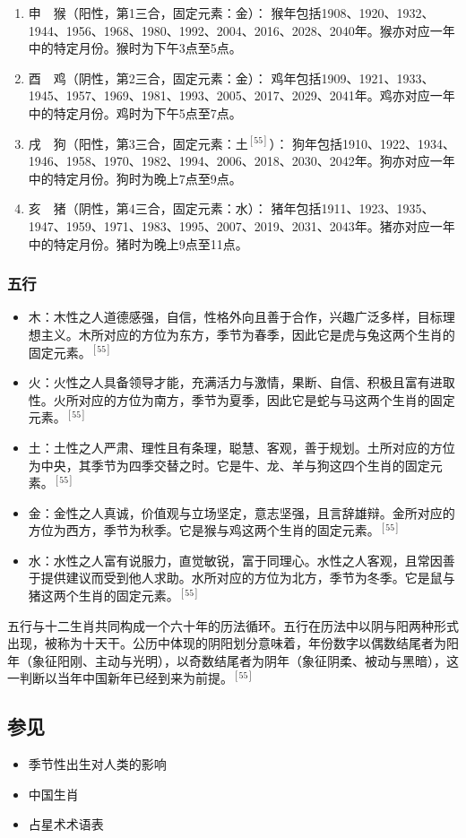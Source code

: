 \begin{enumerate}
\item 申　猴（阳性，第1三合，固定元素：金）：  
猴年包括1908、1920、1932、1944、1956、1968、1980、1992、2004、2016、2028、2040年。猴亦对应一年中的特定月份。猴时为下午3点至5点。
\item 酉　鸡（阴性，第2三合，固定元素：金）：  
鸡年包括1909、1921、1933、1945、1957、1969、1981、1993、2005、2017、2029、2041年。鸡亦对应一年中的特定月份。鸡时为下午5点至7点。
\item 戌　狗（阳性，第3三合，固定元素：土$^{[55]}$）：  
狗年包括1910、1922、1934、1946、1958、1970、1982、1994、2006、2018、2030、2042年。狗亦对应一年中的特定月份。狗时为晚上7点至9点。
\item 亥　猪（阴性，第4三合，固定元素：水）：  
猪年包括1911、1923、1935、1947、1959、1971、1983、1995、2007、2019、2031、2043年。猪亦对应一年中的特定月份。猪时为晚上9点至11点。
\end{enumerate}
\subsubsection{五行}  

\begin{itemize}
\item 木：木性之人道德感强，自信，性格外向且善于合作，兴趣广泛多样，目标理想主义。木所对应的方位为东方，季节为春季，因此它是虎与兔这两个生肖的固定元素。$^{[55]}$
\item 火：火性之人具备领导才能，充满活力与激情，果断、自信、积极且富有进取性。火所对应的方位为南方，季节为夏季，因此它是蛇与马这两个生肖的固定元素。$^{[55]}$
\item 土：土性之人严肃、理性且有条理，聪慧、客观，善于规划。土所对应的方位为中央，其季节为四季交替之时。它是牛、龙、羊与狗这四个生肖的固定元素。$^{[55]}$
\item 金：金性之人真诚，价值观与立场坚定，意志坚强，且言辞雄辩。金所对应的方位为西方，季节为秋季。它是猴与鸡这两个生肖的固定元素。$^{[55]}$
\item 水：水性之人富有说服力，直觉敏锐，富于同理心。水性之人客观，且常因善于提供建议而受到他人求助。水所对应的方位为北方，季节为冬季。它是鼠与猪这两个生肖的固定元素。$^{[55]}$
\end{itemize}
五行与十二生肖共同构成一个六十年的历法循环。五行在历法中以阴与阳两种形式出现，被称为十天干。公历中体现的阴阳划分意味着，年份数字以偶数结尾者为阳年（象征阳刚、主动与光明），以奇数结尾者为阴年（象征阴柔、被动与黑暗），这一判断以当年中国新年已经到来为前提。$^{[55]}$
\subsection{参见}  
\begin{itemize}
\item 季节性出生对人类的影响  
\item 中国生肖  
\item 占星术术语表
\end{itemize}